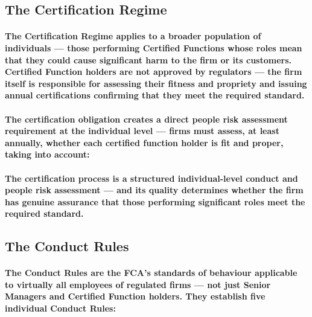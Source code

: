 \subsection{The Certification Regime}
\paragraph{The \textbf{Certification Regime} applies to a broader population of individuals — those performing \textbf{Certified Functions} whose roles mean that they could cause significant harm to the firm or its customers. Certified Function holders are not approved by regulators — the firm itself is responsible for assessing their fitness and propriety and issuing annual certifications confirming that they meet the required standard.}
\paragraph{The certification obligation creates a direct people risk assessment requirement at the individual level — firms must assess, at least annually, whether each certified function holder is fit and proper, taking into account:}
\begin{itemize}
\end{itemize}
\paragraph{The certification process is a structured individual-level conduct and people risk assessment — and its quality determines whether the firm has genuine assurance that those performing significant roles meet the required standard.}

\subsection{The Conduct Rules}
\paragraph{The \textbf{Conduct Rules} are the FCA's standards of behaviour applicable to virtually all employees of regulated firms — not just Senior Managers and Certified Function holders. They establish five individual Conduct Rules:}
\begin{itemize}
\end{itemize}
